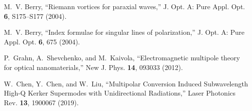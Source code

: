 \documentclass[aps,twocolumn,superscriptaddress]{revtex4-1}
\begin{document}
\begin{thebibliography}{10}
M.~V. Berry, \enquote{Riemann vortices for paraxial
  waves,} J. Opt. A: Pure Appl. Opt. \textbf{6}, S175--S177 (2004).

M.~V. Berry, \enquote{Index formulae for singular lines of polarization,} J.
  Opt. A: Pure Appl. Opt. \textbf{6}, 675 (2004).

P.~Grahn, A.~Shevchenko, and M.~Kaivola, \enquote{Electromagnetic multipole
  theory for optical nanomaterials,} New J. Phys. \textbf{14}, 093033 (2012).

W.~Chen, Y.~Chen, and W.~Liu, \enquote{Multipolar {{Conversion Induced
  Subwavelength High}}-{{Q Kerker Supermodes}} with {{Unidirectional
  Radiations}},} Laser Photonics Rev. \textbf{13}, 1900067 (2019).

\end{thebibliography}
\end{document}
